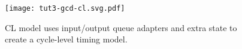 
\begin{figure}
  \centering

  \begin{minipage}[t]{0.52\tw}
    \vspace{0pt}

    \texttt{[image: tut3-gcd-cl.svg.pdf]}
  \end{minipage}
  \hfill
  \begin{minipage}[t]{0.45\tw}

    \caption{ CL model uses
      input/output queue adapters and extra state to create a cycle-level
      timing model.}

    \label{fig-tut3-gcd-cl}

  \end{minipage}

\end{figure}

